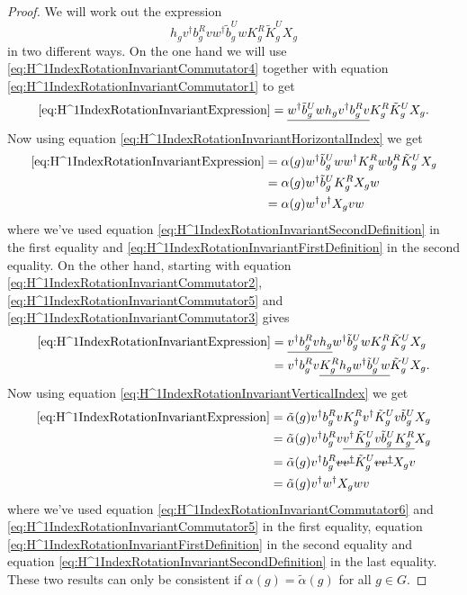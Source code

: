 \documentclass[12pt,a4paper,twoside]{article}
\newcommand{\stkout}[1]{\ifmmode\text{\sout{\ensuremath{#1}}}\else\sout{#1}\fi}
\theoremstyle{definition}
\numberwithin{equation}{section}
\begin{document}
\begin{proof}
	We will work out the expression
	\begin{equation}\label{eq:H^1IndexRotationInvariantExpression}
		h_g v^\dagger b_g^R v w^\dagger\tilde{b}_g^U w K_g^R\tilde{K}_g^U X_g
	\end{equation}
	in two different ways. On the one hand we will use \eqref{eq:H^1IndexRotationInvariantCommutator4} together with equation \eqref{eq:H^1IndexRotationInvariantCommutator1} to get
	\begin{equation}
		\eqref{eq:H^1IndexRotationInvariantExpression}= \underline{w^\dagger\tilde{b}_g^U w h_g v^\dagger b_g^R v} K_g^R\tilde{K}_g^U X_g.
	\end{equation}
	Now using equation \eqref{eq:H^1IndexRotationInvariantHorizontalIndex} we get
	\begin{align}
		\eqref{eq:H^1IndexRotationInvariantExpression}&=\alpha(g)w^\dagger\tilde{b}_g^U w w^\dagger K_g^R w b_g^R\tilde{K}_g^U X_g\\
		&=\alpha(g)w^\dagger\tilde{b}_g^U  K_g^R X_g w\\
		&=\alpha(g)w^\dagger v^\dagger X_g v w
	\end{align}
	where we've used equation \eqref{eq:H^1IndexRotationInvariantSecondDefinition} in the first equality and \eqref{eq:H^1IndexRotationInvariantFirstDefinition} in the second equality. On the other hand, starting with equation \eqref{eq:H^1IndexRotationInvariantCommutator2}, \eqref{eq:H^1IndexRotationInvariantCommutator5} and \eqref{eq:H^1IndexRotationInvariantCommutator3} gives
	\begin{align}
		\eqref{eq:H^1IndexRotationInvariantExpression}&= \underline{v^\dagger b_g^R v h_g} w^\dagger\tilde{b}_g^U w K_g^R\tilde{K}_g^U X_g\\
		&=v^\dagger b_g^R v \underline{K_g^R h_g w^\dagger\tilde{b}_g^U w} \tilde{K}_g^U X_g.
	\end{align}
	Now using equation \eqref{eq:H^1IndexRotationInvariantVerticalIndex} we get
	\begin{align}
		\eqref{eq:H^1IndexRotationInvariantExpression}&=\tilde{\alpha}(g)v^\dagger b_g^R v K_g^R v^\dagger \tilde{K}_g^U v \tilde{b}_g^U X_g\\
		&=\tilde{\alpha}(g)v^\dagger b_g^R v \underline{v^\dagger \tilde{K}_g^U v \tilde{b}_g^U K_g^R} X_g\\
		&=\tilde{\alpha}(g)v^\dagger b_g^R \stkout{v v^\dagger} \tilde{K}_g^U \stkout{v v^\dagger} X_g v\\
		&=\tilde{\alpha}(g) v^\dagger w^\dagger X_g w v
	\end{align}
	where we've used equation \eqref{eq:H^1IndexRotationInvariantCommutator6} and \eqref{eq:H^1IndexRotationInvariantCommutator5} in the first equality, equation \eqref{eq:H^1IndexRotationInvariantFirstDefinition} in the second equality and equation \eqref{eq:H^1IndexRotationInvariantSecondDefinition} in the last equality. These two results can only be consistent if $\alpha(g)=\tilde{\alpha}(g)$ for all $g\in G$.
\end{proof}
\end{document}
